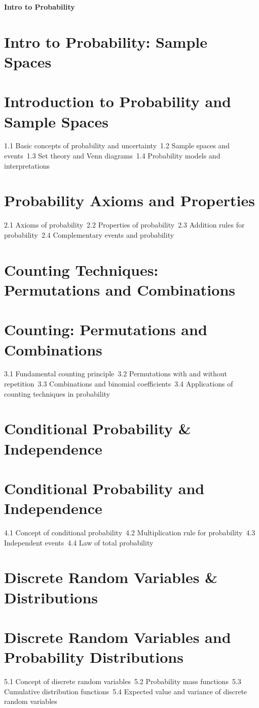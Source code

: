{\LARGE \bf{Intro to Probability}}
\section{Intro to Probability: Sample Spaces}
\section{Introduction to Probability and Sample Spaces}
1.1 Basic concepts of probability and uncertainty\
1.2 Sample spaces and events\
1.3 Set theory and Venn diagrams\
1.4 Probability models and interpretations\
\section{Probability Axioms and Properties}
2.1 Axioms of probability\
2.2 Properties of probability\
2.3 Addition rules for probability\
2.4 Complementary events and probability\
\section{Counting Techniques: Permutations and Combinations}
\section{Counting: Permutations and Combinations}
3.1 Fundamental counting principle\
3.2 Permutations with and without repetition\
3.3 Combinations and binomial coefficients\
3.4 Applications of counting techniques in probability\
\section{Conditional Probability \& Independence}
\section{Conditional Probability and Independence}
4.1 Concept of conditional probability\
4.2 Multiplication rule for probability\
4.3 Independent events\
4.4 Law of total probability\
\section{Discrete Random Variables \& Distributions}
\section{Discrete Random Variables and Probability Distributions}
5.1 Concept of discrete random variables\
5.2 Probability mass functions\
5.3 Cumulative distribution functions\
5.4 Expected value and variance of discrete random variables\
